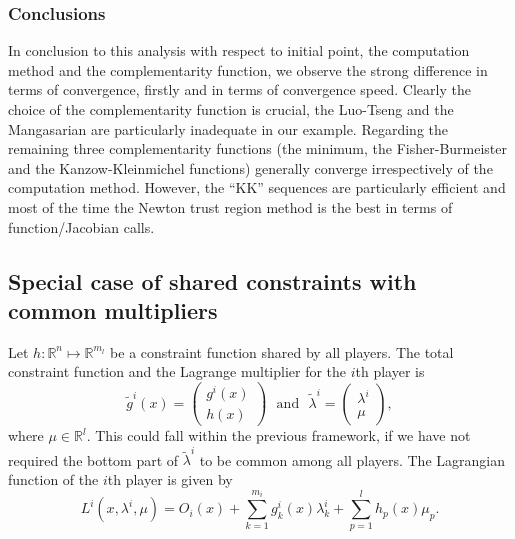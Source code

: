 \documentclass[11pt]{article}
\newcommand{\txtm}[1]{\textrm{~~#1~~}}
\newcommand{\R}{\ensuremath{\mathbb{R}}}
\begin{document}
\subsubsection{Conclusions}
In conclusion to this analysis with respect to initial point, the computation method and the complementarity function, we observe the strong difference in terms of convergence, firstly and in terms of convergence speed. Clearly the choice of the complementarity function is crucial, the Luo-Tseng and the Mangasarian are particularly inadequate in our example. Regarding the remaining three complementarity functions (the minimum, the Fisher-Burmeister and the Kanzow-Kleinmichel functions) generally converge irrespectively of the computation method. However, the ``KK'' sequences are particularly efficient and most of the time the Newton trust region method is the best in terms of function/Jacobian calls.



\subsection{Special case of shared constraints with common multipliers}

Let $h:  \R^{n} \mapsto  \R^{m_l}$ be a constraint function shared by all players. 
The total constraint function and the Lagrange multiplier for the $i$th player is 
$$
\tilde g^i(x) = 
\left( \begin{matrix}
g^i(x) \\
h(x) 
\end{matrix} \right)
\txtm{and}
\tilde \lambda^i = 
\left( \begin{matrix}
\lambda^i \\
\mu
\end{matrix} \right),
$$
where $\mu \in \R^l$.
This could fall within the previous framework, if we have not required the bottom part of $\tilde \lambda^i$ to be common among all players. 
The Lagrangian function of the $i$th player is given by
$$
L ^i(x, \lambda^i, \mu) = O_i(x) + \sum_{k=1}^{m_i} g^i_k(x) \lambda_k^i + \sum_{p=1}^l h_p(x) \mu_p.
$$
\end{document}
